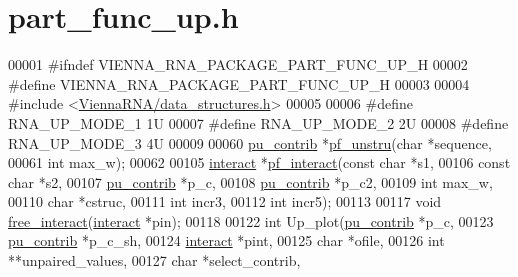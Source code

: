 \hypertarget{part__func__up_8h_source}{}\section{part\+\_\+func\+\_\+up.\+h}
\label{part__func__up_8h_source}

\begin{DoxyCode}
00001 \textcolor{preprocessor}{#ifndef VIENNA\_RNA\_PACKAGE\_PART\_FUNC\_UP\_H}
00002 \textcolor{preprocessor}{#define VIENNA\_RNA\_PACKAGE\_PART\_FUNC\_UP\_H}
00003 
00004 \textcolor{preprocessor}{#include <\hyperlink{data__structures_8h}{ViennaRNA/data\_structures.h}>}
00005 
00006 \textcolor{preprocessor}{#define   RNA\_UP\_MODE\_1   1U}
00007 \textcolor{preprocessor}{#define   RNA\_UP\_MODE\_2   2U}
00008 \textcolor{preprocessor}{#define   RNA\_UP\_MODE\_3   4U}
00009 
00060 \hyperlink{group__data__structures_structpu__contrib}{pu\_contrib} *\hyperlink{group__up__cofold_ga5b4ee40e190d2f633cd01cf0d2fe93cf}{pf\_unstru}(\textcolor{keywordtype}{char} *sequence,
00061                       \textcolor{keywordtype}{int} max\_w);
00062 
00105 \hyperlink{group__data__structures_structinteract}{interact} *\hyperlink{group__up__cofold_ga1aa0aa02bc3a724f87360c03097afd00}{pf\_interact}(\textcolor{keyword}{const} \textcolor{keywordtype}{char} *s1,
00106                       \textcolor{keyword}{const} \textcolor{keywordtype}{char} *s2,
00107                       \hyperlink{group__data__structures_structpu__contrib}{pu\_contrib} *p\_c,
00108                       \hyperlink{group__data__structures_structpu__contrib}{pu\_contrib} *p\_c2,
00109                       \textcolor{keywordtype}{int} max\_w,
00110                       \textcolor{keywordtype}{char} *cstruc,
00111                       \textcolor{keywordtype}{int} incr3,
00112                       \textcolor{keywordtype}{int} incr5);
00113 
00117 \textcolor{keywordtype}{void} \hyperlink{group__up__cofold_gadde308fd5f696dc271b1532aa96fd12f}{free\_interact}(\hyperlink{group__data__structures_structinteract}{interact} *pin);
00118 
00122 \textcolor{keywordtype}{int} Up\_plot(\hyperlink{group__data__structures_structpu__contrib}{pu\_contrib} *p\_c,
00123             \hyperlink{group__data__structures_structpu__contrib}{pu\_contrib} *p\_c\_sh,
00124             \hyperlink{group__data__structures_structinteract}{interact} *pint,
00125             \textcolor{keywordtype}{char} *ofile,
00126             \textcolor{keywordtype}{int} **unpaired\_values,
00127             \textcolor{keywordtype}{char} *select\_contrib,

\end{DoxyCode}
